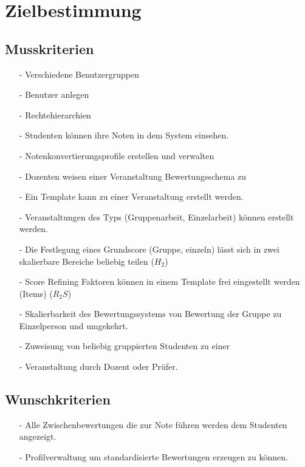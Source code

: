 


	
	\tableofcontents
	\newpage

	\section{Zielbestimmung}
		\subsection{Musskriterien}
			
			\begin{itemize}
			\item[-]	Verschiedene Benutzergruppen 
			\item[-]	Benutzer anlegen
			\item[-]	Rechtehierarchien
			\item[-]	Studenten können ihre Noten in dem System einsehen.
			\item[-]	Notenkonvertierungsprofile erstellen und verwalten
			\item[-]	Dozenten weisen einer Veranstaltung Bewertungsschema zu
			\item[-]	Ein Template kann zu einer Veranstaltung erstellt werden.
			\item[-]	Veranstaltungen des Typs (Gruppenarbeit, Einzelarbeit) können erstellt werden.
			\item[-]	Die Festlegung eines Grundscore (Gruppe, einzeln) lässt sich in zwei skalierbare \newline Bereiche beliebig teilen ($H_2$)
			\item[-]	Score Refining Faktoren können in einem Template frei eingestellt werden (Items) ($R_2S$)
			\item[-]	Skalierbarkeit des Bewertungssystems von Bewertung der Gruppe zu Einzelperson und umgekehrt.
			\item[-]	Zuweisung von beliebig gruppierten Studenten zu einer \item[-]	Veranstaltung durch Dozent oder Prüfer.				
			\end{itemize}

			
		\subsection{Wunschkriterien}
		\begin{itemize}
		\item[-]	Alle Zwischenbewertungen die zur Note führen werden dem Studenten angezeigt.
		\item[-]	Profilverwaltung um standardisierte Bewertungen erzeugen zu können.
		\end{itemize}
		
